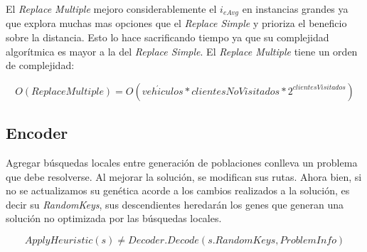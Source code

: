 \bigskip

El \textit{Replace Multiple} mejoro considerablemente el $i_{eAvg}$ en instancias grandes ya que explora muchas mas opciones que el \textit{Replace Simple} y prioriza el beneficio sobre la distancia. Esto lo hace sacrificando tiempo ya que su complejidad algorítmica es mayor a la del \textit{Replace Simple}. El \textit{Replace Multiple} tiene un orden de complejidad:

\begin{equation*}
O(Replace Multiple) = O(veh\acute{i}culos * clientesNoVisitados * 2^{clientesVisitados})
\end{equation*}


\subsection{Encoder}

Agregar búsquedas locales entre generación de poblaciones conlleva un problema que debe resolverse. Al mejorar la solución, se modifican sus rutas. Ahora bien, si no se actualizamos su genética acorde a los cambios realizados a la solución, es decir su \textit{RandomKeys}, sus descendientes heredarán los genes que generan una solución no optimizada por las búsquedas locales.

\begin{equation*}
ApplyHeuristic(s) \neq Decoder.Decode(s.RandomKeys, ProblemInfo)
\end{equation*}


